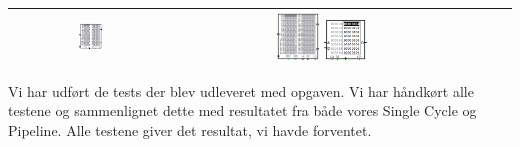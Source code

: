 \documentclass[12pt, a4paper]{article}
\begin{document}
\begin{center}
\begin{tabular}{| c | c | c | c | c | }
	\includegraphics[width=0.15\textwidth]{6-7-8.png} &
	\includegraphics[width=0.15\textwidth]{9.png}
	\includegraphics[width=0.15\textwidth]{s9.png}\\
    \hline
\end{tabular}

\end{center}

Vi har udført de tests der blev udleveret med opgaven. Vi har håndkørt alle testene og sammenlignet dette med resultatet fra både vores Single Cycle og Pipeline. Alle testene giver det resultat, vi havde forventet.
\end{document}
